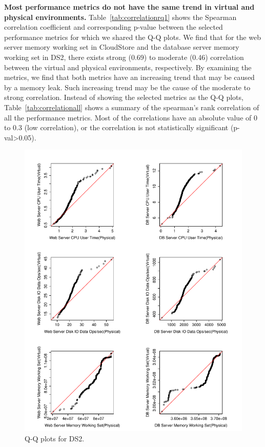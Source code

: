\documentclass[smallextended]{svjour3}       %
\begin{document}
\textbf{Most performance metrics do not have the same trend in virtual and physical environments.} Table~\ref{tab:correlationrq1} shows the Spearman correlation coefficient and corresponding p-value between the selected performance metrics for which we shared the Q-Q plots. We find that for the web server memory working set in CloudStore and the database server memory working set in DS2, there exists strong (0.69) to moderate (0.46) correlation between the virtual and physical environments, respectively. By examining the metrics, we find that both metrics have an increasing trend that may be caused by a memory leak. Such increasing trend may be the cause of the moderate to strong correlation. Instead of showing the selected metrics as the Q-Q plots, Table~\ref{tab:correlationall} shows a summary of the spearman's rank correlation of all the performance metrics. Most of the correlations have an absolute value of 0 to 0.3 (low correlation), or the correlation is not statistically significant (p-val\textgreater0.05).


\noindent{}


\begin{figure}[thb]
	\centering
	\includegraphics[width=0.9\columnwidth]{DS2_qq.pdf}
	\caption{Q-Q plots for DS2.}
	\label{fig:qqds2}
\end{figure}
\end{document}
